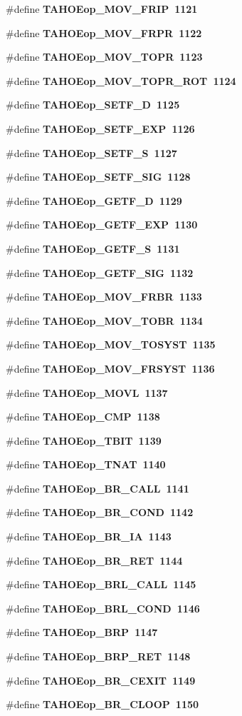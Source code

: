 \begin{CompactItemize}
\item 
\#define \bf{TAHOEop\_\-MOV\_\-FRIP}~1121
\item 
\#define \bf{TAHOEop\_\-MOV\_\-FRPR}~1122
\item 
\#define \bf{TAHOEop\_\-MOV\_\-TOPR}~1123
\item 
\#define \bf{TAHOEop\_\-MOV\_\-TOPR\_\-ROT}~1124
\item 
\#define \bf{TAHOEop\_\-SETF\_\-D}~1125
\item 
\#define \bf{TAHOEop\_\-SETF\_\-EXP}~1126
\item 
\#define \bf{TAHOEop\_\-SETF\_\-S}~1127
\item 
\#define \bf{TAHOEop\_\-SETF\_\-SIG}~1128
\item 
\#define \bf{TAHOEop\_\-GETF\_\-D}~1129
\item 
\#define \bf{TAHOEop\_\-GETF\_\-EXP}~1130
\item 
\#define \bf{TAHOEop\_\-GETF\_\-S}~1131
\item 
\#define \bf{TAHOEop\_\-GETF\_\-SIG}~1132
\item 
\#define \bf{TAHOEop\_\-MOV\_\-FRBR}~1133
\item 
\#define \bf{TAHOEop\_\-MOV\_\-TOBR}~1134
\item 
\#define \bf{TAHOEop\_\-MOV\_\-TOSYST}~1135
\item 
\#define \bf{TAHOEop\_\-MOV\_\-FRSYST}~1136
\item 
\#define \bf{TAHOEop\_\-MOVL}~1137
\item 
\#define \bf{TAHOEop\_\-CMP}~1138
\item 
\#define \bf{TAHOEop\_\-TBIT}~1139
\item 
\#define \bf{TAHOEop\_\-TNAT}~1140
\item 
\#define \bf{TAHOEop\_\-BR\_\-CALL}~1141
\item 
\#define \bf{TAHOEop\_\-BR\_\-COND}~1142
\item 
\#define \bf{TAHOEop\_\-BR\_\-IA}~1143
\item 
\#define \bf{TAHOEop\_\-BR\_\-RET}~1144
\item 
\#define \bf{TAHOEop\_\-BRL\_\-CALL}~1145
\item 
\#define \bf{TAHOEop\_\-BRL\_\-COND}~1146
\item 
\#define \bf{TAHOEop\_\-BRP}~1147
\item 
\#define \bf{TAHOEop\_\-BRP\_\-RET}~1148
\item 
\#define \bf{TAHOEop\_\-BR\_\-CEXIT}~1149
\item 
\#define \bf{TAHOEop\_\-BR\_\-CLOOP}~1150

\end{CompactItemize}
